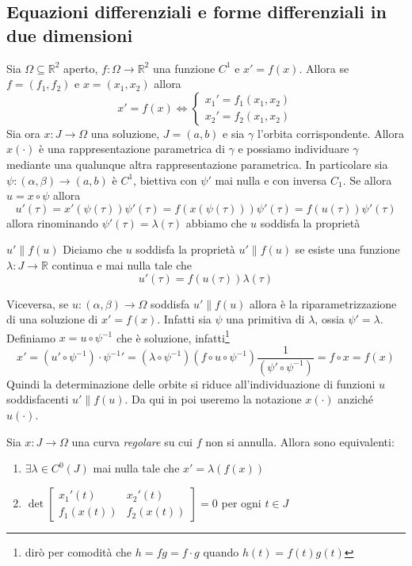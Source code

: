 \subsection{Equazioni differenziali e forme differenziali in due dimensioni} 
Sia \(\Omega \subseteq \mathbb{R}^2 \) aperto, \(f: \Omega \to \mathbb{R}^2\)
una funzione \(C^{1}\) e \(x' = f{(x)}\). Allora se \(f = {(f_{1}, f_{2})}\) e
\(x = {(x_{1}, x_{2})}\) allora
\begin{equation}\label{eq:diff_2}
  x' = f{(x)} \iff \begin{cases}
      x_{1}' = f_{1}{(x_{1}, x_{2})} \\
      x_{2}' = f_{2}{(x_{1}, x_{2})}
    \end{cases}
\end{equation}
Sia ora \(x : J \to \Omega\) una soluzione, \(J = {(a, b)}\) e sia \(\gamma\)
l'orbita corrispondente. Allora \(x{(\cdot )}\) è una rappresentazione
parametrica di \(\gamma\) e possiamo individuare \(\gamma\) mediante una
qualunque altra rappresentazione parametrica. In particolare sia \(\psi :
{(\alpha,\beta)} \to (a, b)\) è \(C^{1}\), biettiva con \(\psi'\) mai nulla e
con inversa \(C_{1}\). Se allora \(u = x \circ \psi\) allora
\[
    u'{(\tau)} = x'{(\psi {(\tau)})}\psi'{(\tau)} =
    f{(x{(\psi{(\tau)})})}\psi'{(\tau)} = f{(u{(\tau)})}\psi'{(\tau)}
\]
allora rinominando \(\psi'{(\tau)} = \lambda{(\tau)}\) abbiamo che \(u\)
soddisfa la proprietà
\begin{definition}{\(u' \parallel f{(u)}\) }
    Diciamo che \(u\) soddisfa la proprietà \(u' \parallel f{(u)}\) se esiste una
    funzione \(\lambda : J \to \mathbb{R}\) continua e mai nulla tale che \[u'{(\tau)} = f{(u{(\tau)})}\lambda{(\tau)}\]
\end{definition}
Viceversa, se \(u : (\alpha, \beta) \to \Omega\) soddisfa \(u' \parallel
f{(u)}\) allora è la riparametrizzazione di una soluzione di \(x' = f{(x)}\).
Infatti sia \(\psi\) una primitiva di \(\lambda\), ossia \(\psi' = \lambda\).
Definiamo \(x = u \circ \psi^{-1}\) che è soluzione, infatti\footnote{dirò per
comodità che \(h = fg = f \cdot g\) quando \(h{(t)} = f{(t)}g{(t)}\)}
\[
x' = {(u'\circ \psi^{-1})}\cdot {\psi^{-1}}' = {(\lambda \circ
\psi^{-1})}{(f \circ u \circ \psi^{-1})} \frac{1}{{(\psi' \circ
\psi^{-1})}} = f \circ x = f{(x)}
\]
Quindi la determinazione delle orbite si riduce all'individuazione di funzioni
\(u\) soddisfacenti \(u'\parallel f{(u)}\). Da qui in poi useremo la notazione
\(x{(\cdot )}\) anziché \(u{(\cdot )}\).
\begin{proposition}\label{prop:41}
    Sia \(x: J \to \Omega\) una curva \emph{regolare} su cui \(f\) non si
    annulla. Allora sono equivalenti:
\begin{enumerate}[label = \roman*)]
    \item \(\exists \lambda \in C^{0}{(J)}\) mai nulla tale che \(x'=
        \lambda{(f{(x)})}\) 
    \item \(\det \begin{bmatrix}
        x_{1}'{(t)} & x_{2}'{(t)} \\
        f_{1}{(x{(t)})} & f_{2}{(x{(t)})}
    \end{bmatrix} = 0\) per ogni \(t \in J\) 
\end{enumerate}
\end{proposition}

